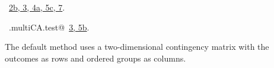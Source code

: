 \documentclass[reqno]{amsart}
\renewcommand{\NWlink}[2]{\hyperlink{#1}{#2}}
\begin{document}
\begin{flushleft}
\begin{list}{}{}
\mbox{}\verb@  }@\\
\mbox{}\verb@@\\
\mbox{}\verb@  df <- length(outcomes) - full@\\
\mbox{}\verb@  p.value <- pchisq(Tt, df=df, lower.tail=FALSE)@\\
\mbox{}\verb@@\\
\mbox{}\verb@  res <- list(statistic = Tt, parameter = df, p.value = p.value, @\\
\mbox{}\verb@              indiv.statistics = CAT, indiv.p.value = CAT.p.value)@\\
\mbox{}\verb@  return(res)@\\
\mbox{}\verb@}@\\
\mbox{}\verb@@{\NWsep}
\end{list}
\vspace{-1.5ex}
\footnotesize
\begin{list}{}{\setlength{\itemsep}{-\parsep}\setlength{\itemindent}{-\leftmargin}}
\item \NWtxtFileDefBy\ \NWlink{nuweb2b}{2b}\NWlink{nuweb3}{, 3}\NWlink{nuweb4a}{, 4a}\NWlink{nuweb5c}{, 5c}\NWlink{nuweb7}{, 7}.
\item \NWtxtIdentsDefed\nobreak\  \verb@.multiCA.test@\nobreak\ \NWlink{nuweb3}{3}\NWlink{nuweb5b}{, 5b}.
\item{}
\end{list}
\vspace{4ex}
\end{flushleft}
The default method uses a two-dimensional contingency matrix with the outcomes as rows and ordered groups as columns.
\end{document}
